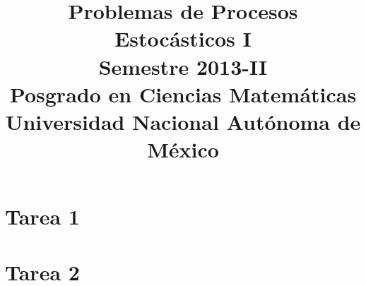 \documentclass[a5paper,oneside]{amsart}
\title[Problemas de Procesos I]{Problemas de Procesos Estocásticos I\\ Semestre 2013-II\\ Posgrado en Ciencias Matemáticas\\ Universidad Nacional Autónoma de México}
\theoremstyle{dotless}
\begin{document}
	\maketitle
	\section{Tarea 1}
		
		
		
		
	\section{Tarea 2}
	
	
	
\end{document}
